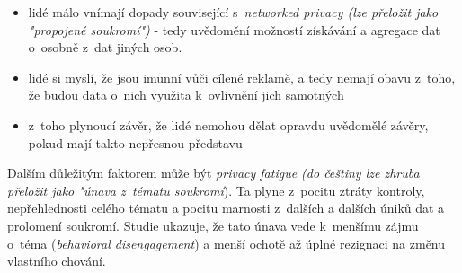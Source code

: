 \begin{itemize}
	\item lidé málo vnímají dopady související s~\textit{networked privacy (lze přeložit jako "propojené soukromí")} - tedy uvědomění možností získávání a agregace dat o~osobně z~dat jiných osob.
	\item lidé si myslí, že jsou imunní vůči cílené reklamě, a tedy nemají obavu z~toho, že budou data o~nich využita k~ovlivnění jich samotných
	\item z~toho plynoucí závěr, že lidé nemohou dělat opravdu uvědomělé závěry, pokud mají takto nepřesnou představu
\end{itemize}

Dalším důležitým faktorem může být \textit{privacy fatigue (do češtiny lze zhruba přeložit jako "únava z~tématu soukromí})\citep{privacy-fatigue}. Ta plyne z~pocitu ztráty kontroly, nepřehlednosti celého tématu a pocitu marnosti z~dalších a dalších úniků dat a prolomení soukromí. Studie ukazuje, že tato únava vede k~menšímu zájmu o~téma (\textit{behavioral disengagement}) a menší ochotě až úplné rezignaci na změnu vlastního chování.
